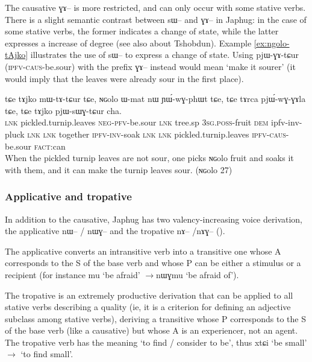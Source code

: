 \documentclass[oldfontcommands,oneside,a4paper,11pt]{article}
\newcommand{\ipa}[1]{{\phon #1}} %
\begin{document}
The causative \ipa{ɣɤ--} is more restricted, and can only occur with some stative verbs. There is a slight semantic contrast between \ipa{sɯ--} and \ipa{ɣɤ--} in Japhug: in the case of some stative verbs, the former indicates a change of state, while the latter expresses a increase of degree (see also \citealt{jackson06paisheng} about Tshobdun). Example \ref{ex:ngolo-tAjko}  illustrates the use of \ipa{sɯ--} to express a change of state. Using \ipa{pjɯ-ɣɤ-tɕur} (\textsc{ipfv-caus}-be.sour) with the prefix \ipa{ɣɤ--} instead would mean `make it sourer' (it would imply that the leaves were already sour in the first place).

 \begin{exe}
\ex \label{ex:ngolo-tAjko}
\gll
\ipa{tɕe} 	\ipa{tɤjko} 	\ipa{mɯ-tɤ-tɕur} 	\ipa{tɕe,} 	\ipa{ɴɢolo} 	\ipa{ɯ-mat} 	\ipa{nɯ} 	\ipa{ɲɯ́-wɣ-phɯt} 	\ipa{tɕe,} 	\ipa{tɕe} 	\ipa{tɤrca} 	\ipa{pjɯ́-wɣ-ɣɤla} 	\ipa{tɕe,} 	\ipa{tɕe} 	\ipa{tɤjko} 	\ipa{pjɯ-sɯɣ-tɕur} 	\ipa{cha.} \\ 
\textsc{lnk} pickled.turnip.leaves \textsc{neg-pfv}-be.sour \textsc{lnk} tree.sp \textsc{3sg.poss}-fruit \textsc{dem} ipfv-inv-pluck \textsc{lnk} \textsc{lnk} together \textsc{ipfv-inv}-soak \textsc{lnk} \textsc{lnk}  pickled.turnip.leaves \textsc{ipfv-caus}-be.sour \textsc{fact}:can \\
 \glt When the pickled turnip leaves are not sour, one picks \ipa{ɴɢolo} fruit and soaks it with them, and it can make the turnip leaves sour.   (\ipa{ɴɢolo} 27)
   \end{exe}

\subsubsection{Applicative and tropative}
In addition to the causative, Japhug has two valency-increasing voice derivation, the applicative \ipa{nɯ--} / \ipa{nɯɣ--} and the tropative \ipa{nɤ--} /\ipa{nɤɣ--} (\citealt{jacques13tropative}).

The applicative converts an intransitive verb into a transitive one whose A corresponds to the S of the base verb and whose P can be either a stimulus or a recipient (for instance \ipa{mu} `be afraid' $\rightarrow$\ipa{nɯɣmu} `be afraid of'). 

The tropative is an extremely productive derivation that can be applied to all stative verbs describing a quality (ie, it is a criterion for defining an adjective subclass among stative verbs), deriving a transitive whose P corresponds to the S of the base verb (like a causative) but whose A is an experiencer, not an agent. The tropative verb has the meaning `to find / consider to be', thus \ipa{xtɕi} `be small' $\rightarrow$ `to find small'.
\end{document}
